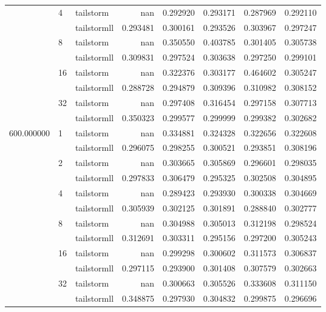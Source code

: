 \begin{tabular}{lllrrrrr}
 & \multirow[c]{2}{*}{4} & tailstorm & nan & 0.292920 & 0.293171 & 0.287969 & 0.292110 \\
 &  & tailstormll & 0.293481 & 0.300161 & 0.293526 & 0.303967 & 0.297247 \\
 & \multirow[c]{2}{*}{8} & tailstorm & nan & 0.350550 & 0.403785 & 0.301405 & 0.305738 \\
 &  & tailstormll & 0.309831 & 0.297524 & 0.303638 & 0.297250 & 0.299101 \\
 & \multirow[c]{2}{*}{16} & tailstorm & nan & 0.322376 & 0.303177 & 0.464602 & 0.305247 \\
 &  & tailstormll & 0.288728 & 0.294879 & 0.309396 & 0.310982 & 0.308152 \\
 & \multirow[c]{2}{*}{32} & tailstorm & nan & 0.297408 & 0.316454 & 0.297158 & 0.307713 \\
 &  & tailstormll & 0.350323 & 0.299577 & 0.299999 & 0.299382 & 0.302682 \\
\multirow[c]{12}{*}{600.000000} & \multirow[c]{2}{*}{1} & tailstorm & nan & 0.334881 & 0.324328 & 0.322656 & 0.322608 \\
 &  & tailstormll & 0.296075 & 0.298255 & 0.300521 & 0.293851 & 0.308196 \\
 & \multirow[c]{2}{*}{2} & tailstorm & nan & 0.303665 & 0.305869 & 0.296601 & 0.298035 \\
 &  & tailstormll & 0.297833 & 0.306479 & 0.295325 & 0.302508 & 0.304895 \\
 & \multirow[c]{2}{*}{4} & tailstorm & nan & 0.289423 & 0.293930 & 0.300338 & 0.304669 \\
 &  & tailstormll & 0.305939 & 0.302125 & 0.301891 & 0.288840 & 0.302777 \\
 & \multirow[c]{2}{*}{8} & tailstorm & nan & 0.304988 & 0.305013 & 0.312198 & 0.298524 \\
 &  & tailstormll & 0.312691 & 0.303311 & 0.295156 & 0.297200 & 0.305243 \\
 & \multirow[c]{2}{*}{16} & tailstorm & nan & 0.299298 & 0.300602 & 0.311573 & 0.306837 \\
 &  & tailstormll & 0.297115 & 0.293900 & 0.301408 & 0.307579 & 0.302663 \\
 & \multirow[c]{2}{*}{32} & tailstorm & nan & 0.300663 & 0.305526 & 0.333608 & 0.311150 \\
 &  & tailstormll & 0.348875 & 0.297930 & 0.304832 & 0.299875 & 0.296696 \\
\end{tabular}
